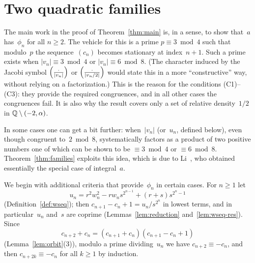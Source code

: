 \chapter{Two quadratic families}
\label{chap:families}

The main work in the proof of Theorem~\ref{thm:main} is, in a sense, to show that~$a$
has~$\phi_n$ for all $n \ge 2$. The vehicle for this is a prime $p \equiv 3 \bmod 4$ such that
modulo~$p$ the sequence~$(c_n)$ becomes stationary at index~$n + 1$. Such a prime exists when
$|v_n| \equiv 3 \bmod 4$ or $|v_n| \equiv 6 \bmod 8$. (The character induced by the Jacobi symbol
$\left(\frac{\cdot}{|v_n|}\right)$ or $\left(\frac{\cdot}{|v_n/2|}\right)$ would state this in a more ``constructive'' way,
without relying on a factorization.) This is the reason for the conditions (C1)--(C3): they
provide the required congruences, and in all other cases the congruences fail. It is also why
the result covers only a set of relative density~$1/2$ in $\mathbb{Q} \setminus (-2, \alpha)$.

In some cases one can get a bit further: when~$|v_n|$ (or~$u_n$, defined below), even though
congruent to~$2 \bmod 8$, systematically factors as a product of two positive numbers one of
which can be shown to be $\equiv 3 \bmod 4$ or $\equiv 6 \bmod 8$. Theorem~\ref{thm:families}
exploits this idea, which is due to Li~\cite{li2021}, who obtained essentially the special case
of integral~$a$.

We begin with additional criteria that provide~$\phi_n$ in certain cases. For $n \ge 1$ let
\[ u_n = r^2 w_n^2 - r w_n s^{2^{n-1}} + (r + s) s^{2^n - 1} \]
(Definition~\ref{def:wseq}); then $c_{n+1} - c_n + 1 = u_n/s^{2^n}$ in lowest terms, and in
particular~$u_n$ and~$s$ are coprime (Lemmas~\ref{lem:reduction} and~\ref{lem:wseq-res}). Since
\[ c_{n+2} + c_n = (c_{n+1} + c_n)(c_{n+1} - c_n + 1) \]
(Lemma~\ref{lem:orbit}(3)), modulo a prime dividing~$u_n$ we have $c_{n+2} \equiv -c_n$, and then
$c_{n+2k} \equiv -c_n$ for all $k \ge 1$ by induction.

